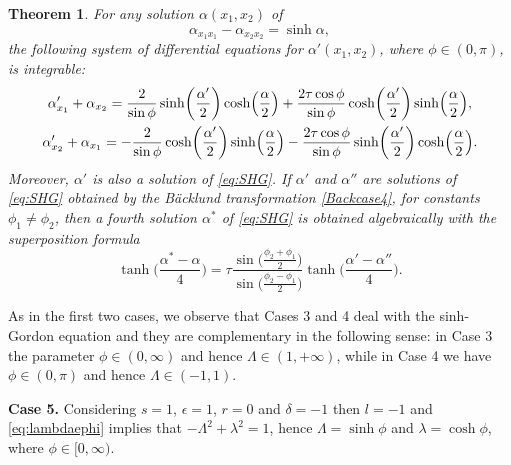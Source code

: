 \documentclass[pdftex]{sigma}
\numberwithin{equation}{section}
\newtheorem{Theorem}{Theorem}[section]
\begin{document}
\begin{Theorem}\label{Sinhgordon}
For any solution $\alpha(x_1,x_2)$ of
\begin{equation}\label{eq:SHG}
\alpha_{x_1x_1}-\alpha_{x_2x_2}=\sinh \alpha,
\end{equation}
 the following system of differential equations for $\alpha'(x_1,x_2)$, where $\phi\in(0,\pi)$, is integrable:
\begin{gather}
\alpha'_{x_1}+\alpha_{x_2}=\frac{2}{\sin\phi}\sinh\biggl(\frac{\alpha'}{2}\biggr)\cosh\Bigl(\frac{\alpha}{2}\Bigr)
+\frac{2\tau\cos\phi}{\sin\phi} \cosh\biggl(\frac{\alpha'}{2}\biggr)\sinh\Bigl(\frac{\alpha}{2}\Bigr),\nonumber\\
\alpha'_{x_2}+\alpha_{x_1}=-\frac{2}{\sin\phi}\cosh\biggl(\frac{\alpha'}{2}\biggr)\sinh\Bigl(\frac{\alpha}{2}\Bigr)
-\frac{2\tau\cos\phi}{\sin\phi}\sinh\biggl(\frac{\alpha'}{2}\biggr)\cosh\Bigl(\frac{\alpha}{2}\Bigr).\label{Backcase4}
\end{gather}
 Moreover, $\alpha'$ is also a solution of \eqref{eq:SHG}.
If $\alpha'$ and $\alpha''$ are solutions of \eqref{eq:SHG} obtained by the B\"acklund transformation \eqref{Backcase4}, for constants $\phi_1\neq \phi_2$, then a fourth solution $\alpha^*$ of \eqref{eq:SHG} is obtained algebraically with
 the superposition formula
\begin{equation}\label{superposcase4}
\tanh\biggl(\frac{\alpha^*-\alpha}{4}\biggr) =
\tau \frac{\sin\bigl(\frac{\phi_2+\phi_1}{2}\bigr) } {\sin\bigl(\frac{\phi_2-\phi_1}{2}\bigr)}
\tanh\biggl(\frac{\alpha'-\alpha''}{4}\biggr).
\end{equation}
\end{Theorem}

As in the first two cases, we observe that Cases 3 and 4 deal with the sinh-Gordon equation and they are complementary in the following sense: in Case 3 the parameter
 $\phi\in(0,\infty)$ and hence $\Lambda\in (1,+\infty)$, while in Case 4 we have $\phi\in (0,\pi)$ and hence
$\Lambda\in (-1,1)$.


{\bf Case 5.}
 Considering $s=1$, $\epsilon=1$, $r=0$ and $\delta=-1$ then $l=-1$ and \eqref{eq:lambdaephi} implies that
$-\Lambda^2 +\lambda^2=1$, hence $\Lambda=\sinh\phi$ and $\lambda=\cosh\phi$,
where $\phi\in [0,\infty)$.
\end{document}
